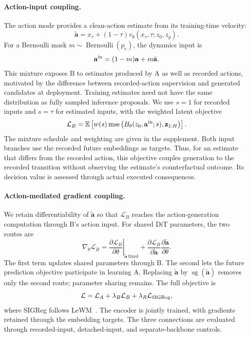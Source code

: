 \paragraph{Action-input coupling.}
The action mode provides a clean-action estimate from its training-time velocity:
\begin{equation}
 \tilde{\mathbf a}=x_\tau+(1-\tau)v_\theta(x_\tau,\tau;z_0,z_g).
 \label{eq:clean}
\end{equation}
For a Bernoulli mask $m\sim\operatorname{Bernoulli}(p_e)$, the dynamics input is
\begin{equation}
 \mathbf a^{\rm in}=(1-m)\mathbf a+m\tilde{\mathbf a}.
\end{equation}
This mixture exposes B to estimates produced by A as well as recorded actions, motivated by the difference between recorded-action supervision and generated candidates at deployment. Training estimates need not have the same distribution as fully sampled inference proposals. We use $s=1$ for recorded inputs and $s=\tau$ for estimated inputs, with the weighted latent objective
\begin{equation}
 \mathcal L_B=\mathbb E\left[w(s)\operatorname{mse}\left(B_\theta(z_0,\mathbf a^{\rm in};s),\mathbf z_{1:H}\right)\right].
 \label{eq:dynamics_loss}
\end{equation}
The mixture schedule and weighting are given in the supplement. Both input branches use the recorded future embeddings as targets. Thus, for an estimate that differs from the recorded action, this objective couples generation to the recorded transition without observing the estimate's counterfactual outcome. Its decision value is assessed through actual executed consequences.

\paragraph{Action-mediated gradient coupling.}
We retain differentiability of $\tilde{\mathbf a}$ so that $\mathcal L_B$ reaches the action-generation computation through B's action input. For shared DiT parameters, the two routes are
\begin{equation}
 \nabla_\theta\mathcal L_B=
 \left.\frac{\partial\mathcal L_B}{\partial\theta}\right|_{\tilde{\mathbf a}\ \mathrm{fixed}}
 +\frac{\partial\mathcal L_B}{\partial\tilde{\mathbf a}}
   \frac{\partial\tilde{\mathbf a}}{\partial\theta}.
 \label{eq:gradient_routes}
\end{equation}
The first term updates shared parameters through B. The second lets the future prediction objective participate in learning A. Replacing $\tilde{\mathbf a}$ by $\operatorname{sg}(\tilde{\mathbf a})$ removes only the second route; parameter sharing remains. The full objective is
\begin{equation}
 \mathcal L=\mathcal L_A+\lambda_B\mathcal L_B+\lambda_R\mathcal L_{\rm SIGReg},
 \label{eq:joint}
\end{equation}
where SIGReg follows LeWM~\cite{maes2026lewm}. The encoder is jointly trained, with gradients retained through the embedding targets. The three connections are evaluated through recorded-input, detached-input, and separate-backbone controls.

